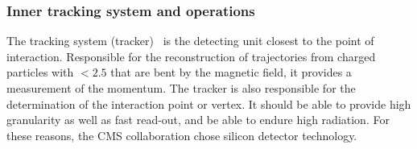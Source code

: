 \subsubsection{Inner tracking system and operations}
\label{sec:TRK}
The tracking system (tracker)~\cite{Chatrchyan:1704291} is the detecting unit closest to the point of interaction. Responsible for the reconstruction of  trajectories from charged particles with \abspsrap $<2.5$ that are bent by the magnetic field, it provides a measurement of the momentum. The tracker is also responsible for the determination of the interaction point or vertex. It should be able to provide high granularity as well as fast read-out, and be able to endure high radiation. For these reasons, the CMS collaboration chose silicon detector technology.

